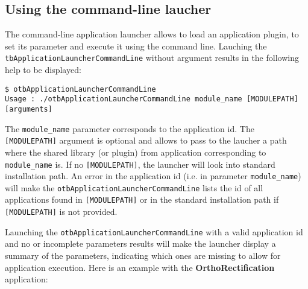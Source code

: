 \subsection{Using the command-line laucher}

The command-line application launcher allows to load an application
plugin, to set its parameter and execute it using the command
line. Lauching the \verb?tbApplicationLauncherCommandLine?
without argument results in the following help to be displayed:

\begin{verbatim}
$ otbApplicationLauncherCommandLine 
Usage : ./otbApplicationLauncherCommandLine module_name [MODULEPATH] [arguments]
\end{verbatim} 

The \verb?module_name? parameter corresponds to the application
id. The \verb?[MODULEPATH]? argument is optional and allows to pass to
the laucher a path where the shared library (or plugin) from
application corresponding to \verb?module_name? is. If no
\verb?[MODULEPATH]?, the launcher will look into standard \otb
installation path. An error in the application id (i.e. in parameter
\verb?module_name?) will make the
\verb?otbApplicationLauncherCommandLine? lists the id of all
applications found in \verb?[MODULEPATH]? or in the standard \otb
installation path if \verb?[MODULEPATH]? is not provided.

Launching the \verb?otbApplicationLauncherCommandLine? with a valid
application id and no or incomplete parameters results will make the
launcher display a summary of the parameters, indicating which ones
are missing to allow for application execution. Here is an example
with the \textbf{OrthoRectification} application:

